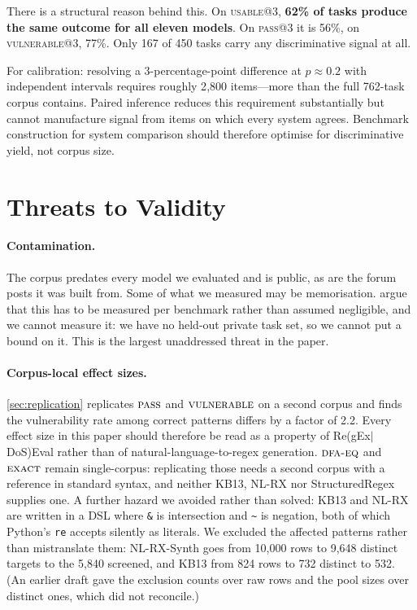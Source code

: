 \documentclass[11pt]{article}
\newcommand{\pass}{\textsc{pass}}
\newcommand{\usable}{\textsc{usable}}
\newcommand{\vuln}{\textsc{vulnerable}}
\newcommand{\dfaeq}{\textsc{dfa-eq}}
\newcommand{\exact}{\textsc{exact}}
\begin{document}
There is a structural reason behind this. On \usable{}@3, \textbf{62\% of
tasks produce the same outcome for all eleven models}. On \pass{}@3 it is
56\%, on \vuln{}@3, 77\%. Only 167 of 450 tasks carry any
discriminative signal at all.

For calibration: resolving a 3-percentage-point difference at $p \approx 0.2$
with independent intervals requires roughly 2{,}800 items---more than the
full 762-task corpus contains. Paired inference reduces this requirement
substantially but cannot manufacture signal from items on which every system
agrees. Benchmark construction for system comparison should therefore
optimise for discriminative yield, not corpus size.

\section{Threats to Validity}
\label{sec:threats}

\paragraph{Contamination.} The corpus predates every model we evaluated and
is public, as are the forum posts it was built from. Some of what we measured
may be memorisation. \citet{sainz2023contamination} argue that this has to be
measured per benchmark rather than assumed negligible, and we cannot measure
it: we have no held-out private task set, so we cannot put a bound on it.
This is the largest unaddressed threat in the paper.

\paragraph{Corpus-local effect sizes.} \cref{sec:replication} replicates
$\pass{}$ and $\vuln{}$ on a second corpus and finds the vulnerability rate
among correct patterns differs by a factor of 2.2. Every effect size in this
paper should therefore be read as a property of Re(gEx$|$DoS)Eval rather than
of natural-language-to-regex generation. $\dfaeq{}$ and $\exact{}$ remain
single-corpus: replicating those needs a second corpus with a reference in
standard syntax, and neither KB13, NL-RX nor StructuredRegex supplies one. A further hazard we avoided
rather than solved: KB13 and NL-RX are written in a DSL where \texttt{\&} is
intersection and \texttt{\~{}} is negation, both of which Python's
\texttt{re} accepts silently as literals. We excluded the affected patterns rather than mistranslate them: NL-RX-Synth
goes from 10{,}000 rows to 9{,}648 distinct targets to the 5{,}840 screened,
and KB13 from 824 rows to 732 distinct to 532. (An earlier draft gave the
exclusion counts over raw rows and the pool sizes over distinct ones, which
did not reconcile.)
\end{document}
